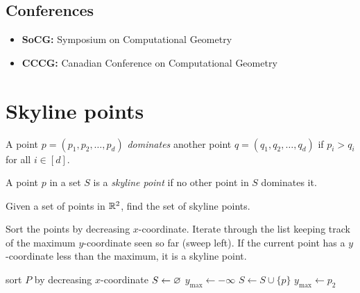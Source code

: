\section*{Conferences} \label{sec:conferences}
\begin{itemize}
    \item \textbf{SoCG:} Symposium on Computational Geometry
    \item \textbf{CCCG:} Canadian Conference on Computational Geometry
\end{itemize}

\chapter{Skyline points} \label{chp:skyline}

\begin{definition*} \label{def:skyline}
    A point $p = (p_1, p_2, \dots, p_d)$ \emph{dominates}
    another point $q = (q_1, q_2, \dots, q_d)$ if
    $p_i > q_i$ for all $i \in [d]$.

    A point $p$ in a set $S$ is a \emph{skyline point} if no other point in
    $S$ dominates it.
\end{definition*}

\begin{question*}
    Given a set of points in $\mathbb{R}^2$, find the set of skyline points.
\end{question*}
\begin{solution}
    Sort the points by decreasing $x$-coordinate.
    Iterate through the list keeping track of the maximum $y$-coordinate
    seen so far (sweep left).
    If the current point has a $y$-coordinate less than the maximum,
    it is a skyline point.
    \begin{algo}
            \State sort $P$ by decreasing $x$-coordinate
            \State $S \gets \varnothing$
            \State $y_{\max} \gets -\infty$
                    \State $S \gets S \cup \{p\}$
                    \State $y_{\max} \gets p_2$
                \EndIf
            \EndFor
        \EndFn
    \end{algo} \vspace{-1.3em}
\end{solution}

